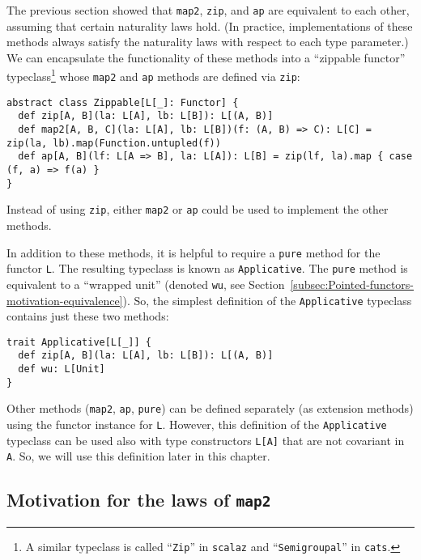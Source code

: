 The previous section showed that \lstinline!map2!, \lstinline!zip!,
and \lstinline!ap! are equivalent to each other, assuming that certain
naturality laws hold. (In practice, implementations of these methods
always satisfy the naturality laws with respect to each type parameter.)
We can encapsulate the functionality of these methods into a \textsf{``}zippable
functor\textsf{''} typeclass\footnote{A similar typeclass is called \textsf{``}\lstinline!Zip!\textsf{''} in \texttt{scalaz}
and \textsf{``}\lstinline!Semigroupal!\textsf{''} in \texttt{cats}.} whose \lstinline!map2! and \lstinline!ap! methods are defined via
\lstinline!zip!:
\begin{lstlisting}
abstract class Zippable[L[_]: Functor] {
  def zip[A, B](la: L[A], lb: L[B]): L[(A, B)]
  def map2[A, B, C](la: L[A], lb: L[B])(f: (A, B) => C): L[C] = zip(la, lb).map(Function.untupled(f))
  def ap[A, B](lf: L[A => B], la: L[A]): L[B] = zip(lf, la).map { case (f, a) => f(a) }
}
\end{lstlisting}
Instead of using \lstinline!zip!, either \lstinline!map2! or \lstinline!ap!
could be used to implement the other methods.

In addition to these methods, it is helpful to require a \lstinline!pure!
method for the functor \lstinline!L!. The resulting typeclass
is known as \lstinline!Applicative!. The \lstinline!pure! method
is equivalent to a \textsf{``}wrapped unit\textsf{''} (denoted \lstinline!wu!, see
Section~\ref{subsec:Pointed-functors-motivation-equivalence}). So,
the simplest definition of the \lstinline!Applicative! typeclass
contains just these two methods:
\begin{lstlisting}
trait Applicative[L[_]] {
  def zip[A, B](la: L[A], lb: L[B]): L[(A, B)]
  def wu: L[Unit]
}
\end{lstlisting}
Other methods (\lstinline!map2!, \lstinline!ap!, \lstinline!pure!)
can be defined separately (as extension methods) using the functor
instance for \lstinline!L!. However, this definition of the \lstinline!Applicative!
typeclass can be used also with type constructors \lstinline!L[A]!
that are not covariant in \lstinline!A!. So, we will use this definition
later in this chapter.

\subsection{Motivation for the laws of \texttt{map2}\label{subsec:Motivation-for-the-laws-of-map2}}

